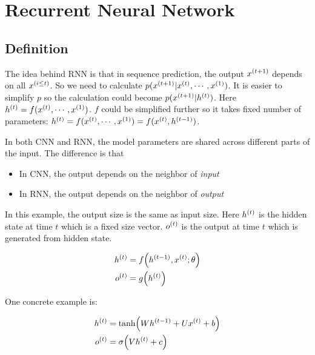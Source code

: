 \chapter{Recurrent Neural Network}


\section{Definition}

The idea behind RNN is that in sequence prediction, the output ${x}^{(t+1)}$ depends on all ${x}^{(i \leq t)}$. So we need to calculate $p({x}^{(t+1)}|{x}^{(t)}, \cdots, {x}^{(1)})$. It is easier to simplify $p$ so the calculation could become $p({x}^{(t+1)}|{h}^{(t)})$. Here ${h}^{(t)} = f({x}^{(t)}, \cdots, {x}^{(1)})$. $f$ could be simplified further so it takes fixed number of parameters: ${h}^{(t)} = f({x}^{(t)}, \cdots, {x}^{(1)}) = f({x}^{(t)}, {h}^{(t-1)})$.

In both CNN and RNN, the model parameters are shared across different parts of the input. The difference is that
\begin{itemize}
    \item In CNN, the output depends on the neighbor of \emph{input}
    \item In RNN, the output depends on the neighbor of \emph{output}
\end{itemize}


\begin{example}
    In this example, the output size is the same as input size. Here ${h}^{(t)}$ is the hidden state at time $t$ which is a fixed size vector. ${o}^{(t)}$ is the output at time $t$ which is generated from hidden state.
    
\begin{equation}
    \begin{aligned}
        \selectonesample{h}{t} &= f\mleft(\selectonesample{h}{t-1}, \selectonesample{x}{t}; \theta\mright) \\   
        \selectonesample{o}{t} &= g\mleft(\selectonesample{h}{t}\mright)
    \end{aligned}    
\end{equation}

One concrete example is:

    \begin{equation}
        \begin{aligned}
            \selectonesample{h}{t} &= \tanh\mleft( W \selectonesample{h}{t-1} + U \selectonesample{x}{t} + b \mright) \\
            \selectonesample{o}{t} &= \sigma \mleft(V \selectonesample{h}{t} + c\mright)
        \end{aligned}
    \end{equation}    
\end{example}


